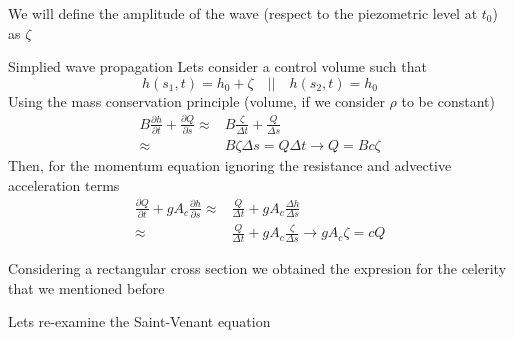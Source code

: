 \documentclass[a4paper, 11pt,article,oneside]{memoir}%
\begin{document}
We will define the amplitude of the wave (respect to the piezometric level at $t_0$) as $\zeta$\\
\begin{eqbox2}{}{Simplied wave propagation}
Lets consider a control volume such that 
$$h(s_1,t)=h_0+\zeta \quad || \quad  h(s_2,t)=h_0$$
Using the  mass conservation principle (volume, if we consider $\rho$ to be constant)
\begin{align*}
B\frac{\partial h}{\partial t}+\frac{\partial Q}{\partial s}\approx&  B\frac{\zeta}{\Delta t}+\frac{Q}{\Delta s}\\
\approx & B\zeta\Delta s = Q\Delta t \longrightarrow   Q=Bc\zeta
\end{align*}
Then, for the momentum equation ignoring the resistance and advective acceleration terms
\begin{align*}
\frac{\partial Q}{\partial t}+gA_c\frac{\partial h}{\partial s}\approx&\frac{ Q}{\Delta t}+gA_c\frac{\Delta h}{\Delta s}\\
\approx& \frac{ Q}{\Delta t}+gA_c\frac{\zeta}{\Delta s}
\longrightarrow gA_c\zeta=cQ
\end{align*}

\begin{note}
Considering a rectangular cross section we obtained the expresion for the celerity that we mentioned before
\end{note}

\end{eqbox2}
Lets re-examine the Saint-Venant equation
\end{document}

